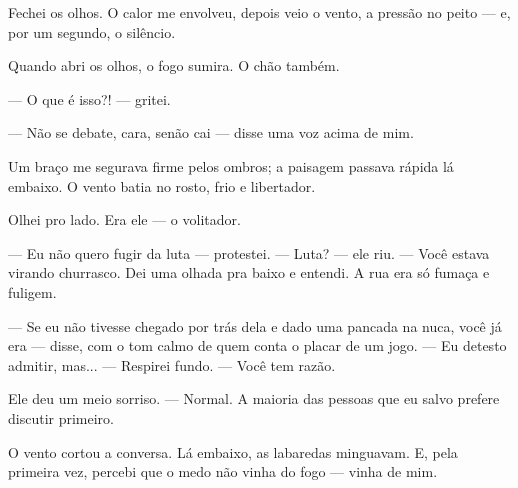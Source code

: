 Fechei os olhos.  
O calor me envolveu, depois veio o vento, a pressão no peito — e, por um segundo, o silêncio.

Quando abri os olhos, o fogo sumira.  
O chão também.

— O que é isso?! — gritei.

— Não se debate, cara, senão cai — disse uma voz acima de mim.

Um braço me segurava firme pelos ombros; a paisagem passava rápida lá embaixo.  
O vento batia no rosto, frio e libertador.

Olhei pro lado.  
Era ele — o volitador.

— Eu não quero fugir da luta — protestei.  
— Luta? — ele riu. — Você estava virando churrasco.  
Dei uma olhada pra baixo e entendi.  
A rua era só fumaça e fuligem.

— Se eu não tivesse chegado por trás dela e dado uma pancada na nuca, você já era — disse, com o tom calmo de quem conta o placar de um jogo.
— Eu detesto admitir, mas... — Respirei fundo. — Você tem razão.

Ele deu um meio sorriso.  
— Normal. A maioria das pessoas que eu salvo prefere discutir primeiro.

O vento cortou a conversa.  
Lá embaixo, as labaredas minguavam.  
E, pela primeira vez, percebi que o medo não vinha do fogo — vinha de mim.
